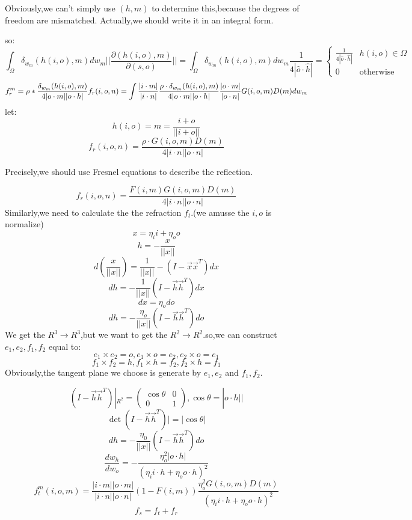 \documentclass[10pt,a4paper]{article}
\begin{document}
Obviously,we can't simply use $(h,m)$ to determine this,because the degrees of freedom are mismatched. Actually,we should write it in an integral form.

so:
\[\int_{\Omega}\delta_{w_m}(h(i,o),m)dw_m||\frac{\partial(h(i,o),m)}{\partial(s,o)}||=\int_{\Omega}\delta_{w_m}(h(i,o),m)dw_m\frac{1}{4|\hat o\cdot\hat h|}=\begin{cases}\frac{1}{4|\hat o\cdot\hat h|}&h(i,o)\in\Omega\\0&\text{otherwise}\end{cases}\]
\[f_r^m=\rho*\frac{\delta_{w_m}(h(i,o),m)}{4|o\cdot m||o\cdot h|}\\[10pt]f_r(i,o,n)=\int\frac{|i\cdot m|}{|i\cdot n|}\frac{\rho\cdot\delta_{w_m}(h(i,o),m)}{4|o\cdot m||o\cdot h|}\frac{|o\cdot m|}{|o\cdot n|}G(i,o,m)D(m)dw_m\]
let:
\[h(i,o)=m=\frac{i+o}{||i+o||}\]
\[f_r(i,o,n)=\frac{\rho\cdot G(i,o,m)D(m)}{4|i\cdot n||o\cdot n|}\]

Precisely,we should use Fresnel equations to describe the reflection.

\[f_r(i,o,n)=\frac{F(i,m)G(i,o,m)D(m)}{4|i\cdot n||o\cdot n|}\]
Similarly,we need to calculate the the refraction $f_t$.(we amusse the $i,o$ is normalize)
\[x=\eta_ii+\eta_oo\]
\[h=-\frac{x}{||x||}\]
\[d(\frac{x}{||x||})=\frac{1}{||x||}-(I-\vec{x}\vec{x}^T)dx\]
\[dh=-\frac{1}{||x||}(I-\vec{h}\vec{h}^T)dx\]
\[dx=\eta_odo\]
\[dh=-\frac{\eta_o}{||x||}(I-\vec{h}\vec{h}^T)do\]
We get the $R^3\to R^3$,but we want to get the $R^2\to R^2$.so,we can construct $e_1,e_2,f_1,f_2$ equal to:
\[e_1\times e_2=o,e_1\times o=e_2,e_2\times o=e_1\]
\[f_1\times f_2=h,f_1\times h=f_2,f_2\times h=f_1\]
Obviously,the tangent plane we choose is generate by $e_1,e_2$ and $f_1,f_2$.

\[(I-\vec{h}\vec{h}^T)|_{R^2}=\begin{pmatrix}\cos\theta&0\\0&1\end{pmatrix},\cos\theta=|o\cdot h||\]
\[\det(I-\vec{h}\vec{h}^T)|=|\cos\theta|\]
\[dh=-\frac{\eta_0}{||x||}(I-\vec{h}\vec{h}^T)do\]
\[\frac{dw_h}{dw_o}=-\frac{\eta_o^2|o\cdot h|}{(\eta_ii\cdot h+\eta_oo\cdot h)^2}\]
\[f_t^m(i,o,m)=\frac{|i\cdot m||o\cdot m|}{|i\cdot n||o\cdot n|}(1-F(i,m))\frac{\eta_o^2G(i,o,m)D(m)}{(\eta_ii\cdot h+\eta_oo\cdot h)^2}\]
\[f_s=f_t+f_r\]
\end{document}

